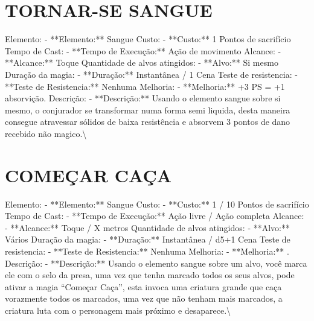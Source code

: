 \documentclass{article}%
\begin{document}
%
\section{TORNAR{-}SE SANGUE}%
\label{sec:TORNAR{-}SESANGUE}%
Elemento: {-} **Elemento:** Sangue\newline%
Custo: {-} **Custo:** 1 Pontos de sacrifício\newline%
Tempo de Cast: {-} **Tempo de Execução:** Ação de movimento\newline%
Alcance: {-} **Alcance:** Toque\newline%
Quantidade de alvos atingidos: {-} **Alvo:** Si mesmo\newline%
Duração da magia: {-} **Duração:** Instantânea / 1 Cena\newline%
Teste de resistencia: {-} **Teste de Resistencia:** Nenhuma\newline%
Melhoria: {-} **Melhoria:** +3 PS = +1 absorvição.\newline%
Descrição: {-} **Descrição:** Usando o elemento sangue sobre si mesmo, o conjurador se transformar numa forma semi liquida, desta maneira consegue atravessar sólidos de baixa resistência e absorvem 3 pontos de dano recebido não magico.\textbackslash{}

%
\section{COMEÇAR CAÇA}%
\label{sec:COMEARCAA}%
Elemento: {-} **Elemento:** Sangue\newline%
Custo: {-} **Custo:** 1 / 10 Pontos de sacrifício\newline%
Tempo de Cast: {-} **Tempo de Execução:** Ação livre / Ação completa\newline%
Alcance: {-} **Alcance:** Toque / X metros\newline%
Quantidade de alvos atingidos: {-} **Alvo:** Vários\newline%
Duração da magia: {-} **Duração:** Instantânea / d5+1 Cena\newline%
Teste de resistencia: {-} **Teste de Resistencia:** Nenhuma\newline%
Melhoria: {-} **Melhoria:** .\newline%
Descrição: {-} **Descrição:** Usando o elemento sangue sobre um alvo, você marca ele com o selo da presa, uma vez que tenha marcado todos os seus alvos, pode ativar a magia “Começar Caça”, esta invoca uma criatura grande que caça vorazmente todos os marcados, uma vez que não tenham mais marcados, a criatura luta com o personagem mais próximo e desaparece.\textbackslash{}
\end{document}
